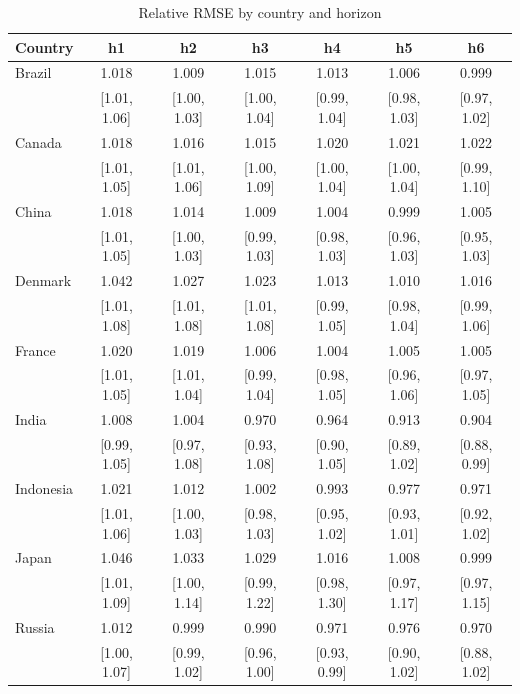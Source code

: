 \begin{table}[htbp]
\centering
\caption{Relative RMSE by country and horizon}
\label{tab:relrmse_country_horizon}
{\fontsize{8}{10}\selectfont\setlength{\tabcolsep}{3pt}
\begin{tabular*}{\textwidth}{@{\extracolsep{\fill}}lcccccc}
\toprule
Country & h1 & h2 & h3 & h4 & h5 & h6 \\
\midrule
Brazil & 1.018 & 1.009 & 1.015 & 1.013 & 1.006 & 0.999 \\
 & [1.01, 1.06] & [1.00, 1.03] & [1.00, 1.04] & [0.99, 1.04] & [0.98, 1.03] & [0.97, 1.02] \\
\addlinespace
Canada & 1.018 & 1.016 & 1.015 & 1.020 & 1.021 & 1.022 \\
 & [1.01, 1.05] & [1.01, 1.06] & [1.00, 1.09] & [1.00, 1.04] & [1.00, 1.04] & [0.99, 1.10] \\
\addlinespace
China & 1.018 & 1.014 & 1.009 & 1.004 & 0.999 & 1.005 \\
 & [1.01, 1.05] & [1.00, 1.03] & [0.99, 1.03] & [0.98, 1.03] & [0.96, 1.03] & [0.95, 1.03] \\
\addlinespace
Denmark & 1.042 & 1.027 & 1.023 & 1.013 & 1.010 & 1.016 \\
 & [1.01, 1.08] & [1.01, 1.08] & [1.01, 1.08] & [0.99, 1.05] & [0.98, 1.04] & [0.99, 1.06] \\
\addlinespace
France & 1.020 & 1.019 & 1.006 & 1.004 & 1.005 & 1.005 \\
 & [1.01, 1.05] & [1.01, 1.04] & [0.99, 1.04] & [0.98, 1.05] & [0.96, 1.06] & [0.97, 1.05] \\
\addlinespace
India & 1.008 & 1.004 & 0.970 & 0.964 & 0.913 & 0.904 \\
 & [0.99, 1.05] & [0.97, 1.08] & [0.93, 1.08] & [0.90, 1.05] & [0.89, 1.02] & [0.88, 0.99] \\
\addlinespace
Indonesia & 1.021 & 1.012 & 1.002 & 0.993 & 0.977 & 0.971 \\
 & [1.01, 1.06] & [1.00, 1.03] & [0.98, 1.03] & [0.95, 1.02] & [0.93, 1.01] & [0.92, 1.02] \\
\addlinespace
Japan & 1.046 & 1.033 & 1.029 & 1.016 & 1.008 & 0.999 \\
 & [1.01, 1.09] & [1.00, 1.14] & [0.99, 1.22] & [0.98, 1.30] & [0.97, 1.17] & [0.97, 1.15] \\
\addlinespace
Russia & 1.012 & 0.999 & 0.990 & 0.971 & 0.976 & 0.970 \\
 & [1.00, 1.07] & [0.99, 1.02] & [0.96, 1.00] & [0.93, 0.99] & [0.90, 1.02] & [0.88, 1.02] \\

\end{tabular*}}
\end{table}
